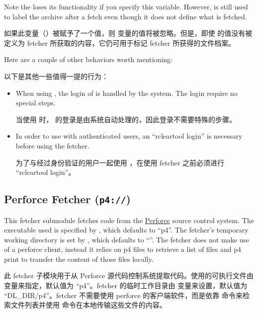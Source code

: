 \medskip
\begin{noteblock}{Note}%
the  loses its functionality if you specify this variable. However,  is still used to label the archive after a fetch even though it does not define what is fetched.

\medskip
如果此变量（）被赋予了一个值，则  变量的值将被忽略。但是，即使  的值没有被定义为 fetcher 所获取的内容，它仍可用于标记 fetcher 所获得的文件档案。
\end{noteblock}

Here are a couple of other behaviors worth mentioning:

以下是其他一些值得一提的行为：

\begin{itemize}
\setlength\itemsep{1.0em}
\item When using , the login of  is handled by the system. The login require no special steps.

\medskip
当使用  时， 的登录是由系统自动处理的，因此登录不需要特殊的步骤。

\item In order to use  with authenticated users, an ``rcleartool login'' is necessary before using the fetcher.

\medskip
为了与经过身份验证的用户一起使用 ，在使用 fetcher 之前必须进行 ``rcleartool login''。
\end{itemize}

\subsection{Perforce Fetcher (\texttt{p4://})}

This fetcher submodule fetches code from the \href{https://www.perforce.com/}{Perforce} source control system. The executable used is specified by , which defaults to ``p4''. The fetcher's temporary working directory is set by , which defaults to ``''. The fetcher does not make use of a perforce client, instead it relies on p4 files to retrieve a list of files and p4 print to transfer the content of those files locally.

此 fetcher 子模块用于从 Perforce 源代码控制系统提取代码。使用的可执行文件由  变量来指定，默认值为 ``p4''。fetcher 的临时工作目录由  变量来设置，默认值为 ``DL\_DIR/p4''。fetcher 不需要使用 perforce 的客户端软件，而是依靠  命令来检索文件列表并使用  命令在本地传输这些文件的内容。

